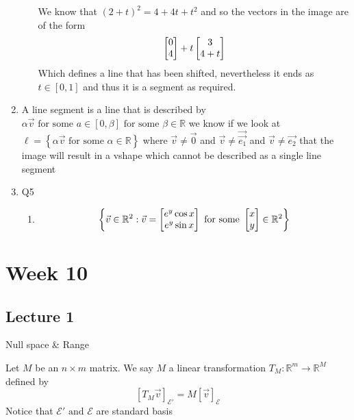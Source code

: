 \documentclass[11pt]{book}
\begin{document}
\begin{enumerate}
\begin{enumerate}
\[            \]
            We know that $\left( 2 + t \right) ^2 = 4 + 4t + t^2  $ and so the vectors in the image are of the form
            \[
            \begin{bmatrix} 0 \\ 4 \end{bmatrix}  + t \begin{bmatrix} 3 \\ 4 + t \end{bmatrix} 
            \]
            Which defines a line that has been shifted, nevertheless it ends as $t \in \left[ 0,1 \right] $ and thus it is a segment as required.
    \end{enumerate}
    \item A line segment is a line that is described by $\alpha \vec{v} \text{ for some  } a \in \left[ 0, \beta  \right] \text{ for some  } \beta \in \mathbb{R} $ we know if we look at $\ell= \left\{ \alpha \vec{v} \text{ for some  } \alpha \in \mathbb{R}   \right\} $ where $\vec{v} \neq \vec{0} $ and $\vec{v} \neq \vec{\vec{e_1} } $ and $\vec{v} \neq \vec{e_2} $ that the image will result in a vshape which cannot be described as a single line segment
    \item Q5
    \begin{enumerate}
        \item 
            \begin{gather*}
                \left\{ \vec{v} \in \mathbb{R}^2 : \vec{v} = \begin{bmatrix} e^{y} \cos{x} \\ e^{y} \sin{x} \end{bmatrix} \text{ for some  } \begin{bmatrix} x \\ y \end{bmatrix} \in \mathbb{R}^2   \right\} \\
            \end{gather*}
    \end{enumerate}
\end{enumerate}



\chapter{Week 10}%
\label{chp:week_10}

\section{Lecture 1}%
\label{sec:lecture_1}

Null space \& Range

\begin{defn}\label{defn:induced_transformation}
    Let $M$ be an $n \times m $ matrix. We say $M$  a linear transformation $T_{M} : \mathbb{R}^{m} \to \mathbb{R}^{M}$ defined by
    \begin{equation*}
        \left[ T_{M}\vec{v} \right]_{\mathcal{E'}} = M\left[ \vec{v} \right]_{\mathcal{E}}  
    \end{equation*}
    Notice that $\mathcal{E'} \text{ and } \mathcal{E} $ are standard basis
\end{defn}
\end{document}
